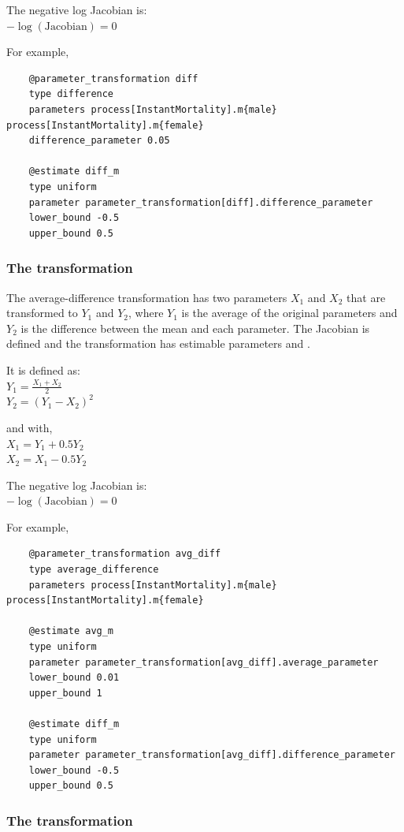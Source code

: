 The negative log Jacobian is: \\
$-\log(\text{Jacobian}) = 0$

For example,
{\small{\begin{verbatim}
	@parameter_transformation diff
	type difference
	parameters process[InstantMortality].m{male} process[InstantMortality].m{female}
	difference_parameter 0.05
	
	@estimate diff_m
	type uniform
	parameter parameter_transformation[diff].difference_parameter
	lower_bound -0.5
	upper_bound 0.5		
\end{verbatim}}}

\subsubsection{The  transformation}  \label{sec:Transformation-AverageDifference}

The average-difference transformation has two parameters $X_1$ and $X_2$ that are transformed to $Y_1$ and $Y_2$, where $Y_1$ is the average of the original parameters and $Y_2$ is the difference between the mean and each parameter. The Jacobian is defined and the transformation has estimable parameters  and .

It is defined as:\\
$Y_1 = \frac{X_1 + X_2}{2}$\\
$Y_2 =  (Y_1 - X_2)^2 $

and with, \\
$X_1 = Y_1 + 0.5Y_2$\\
$X_2 = X_1 - 0.5Y_2$

The negative log Jacobian is: \\
$-\log(\text{Jacobian}) = 0$

For example,
{\small{\begin{verbatim}
	@parameter_transformation avg_diff
	type average_difference
	parameters process[InstantMortality].m{male} process[InstantMortality].m{female}
	
	@estimate avg_m
	type uniform
	parameter parameter_transformation[avg_diff].average_parameter
	lower_bound 0.01
	upper_bound 1
	
	@estimate diff_m
	type uniform
	parameter parameter_transformation[avg_diff].difference_parameter
	lower_bound -0.5
	upper_bound 0.5		
\end{verbatim}}}
	
\subsubsection{The  transformation} \label{sec:Transformation-LogSum}

